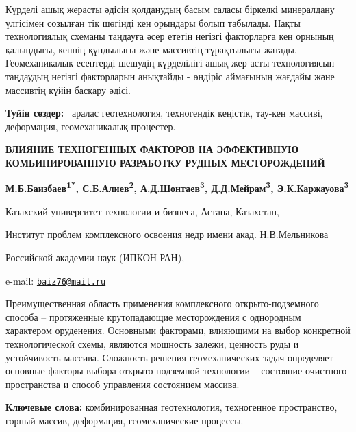 Күрделі ашық жерасты әдісін қолданудың басым саласы біркелкі минералдану
үлгісімен созылған тік шөгінді кен орындары болып табылады. Нақты
технологиялық схеманы таңдауға әсер ететін негізгі факторларға кен
орнының қалыңдығы, кеннің құндылығы және массивтің тұрақтылығы жатады.
Геомеханикалық есептерді шешудің күрделілігі ашық жер асты технологиясын
таңдаудың негізгі факторларын анықтайды - өндіріс аймағының жағдайы және
массивтің күйін басқару әдісі.

{\bfseries Туйін сөздер:} \emph{~}аралас геотехнология, техногендік
кеңістік, тау-кен массиві, деформация, геомеханикалық процестер.

\begin{center}
{\large\bfseries ВЛИЯНИЕ ТЕХНОГЕННЫХ ФАКТОРОВ НА ЭФФЕКТИВНУЮ КОМБИНИРОВАННУЮ РАЗРАБОТКУ РУДНЫХ МЕСТОРОЖДЕНИЙ}

{\bfseries М.Б.Баизбаев\textsuperscript{1*}, С.Б.Алиев\textsuperscript{2},
А.Д.Шонтаев\textsuperscript{3}, Д.Д.Мейрам\textsuperscript{3},
Э.К.Каржауова\textsuperscript{3}}

Казахский университет технологии и бизнеса, Астана, Казахстан,

Институт проблем комплексного освоения недр имени акад. Н.В.Мельникова

Российской академии наук (ИПКОН РАН),

e-mail: \href{mailto:baiz76@mail.ru}{\nolinkurl{baiz76@mail.ru}}
\end{center}

Преимущественная область применения комплексного открыто-подземного
способа -- протяженные крутопадающие месторождения с однородным
характером оруденения. Основными факторами, влияющими на выбор
конкретной технологической схемы, являются мощность залежи, ценность
руды и устойчивость массива. Сложность решения геомеханических задач
определяет основные факторы выбора открыто-подземной технологии --
состояние очистного пространства и способ управления состоянием массива.

{\bfseries Ключевые слова:} комбинированная геотехнология, техногенное
пространство, горный массив, деформация, геомеханические процессы.

